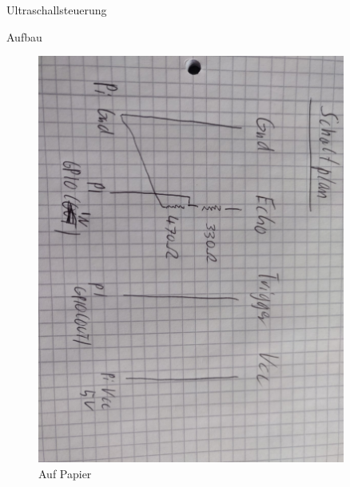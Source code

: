 \documentclass[12pt,twoside]{report}
\begin{document}
\begin{section}{Ultraschallsteuerung}
\begin{subsection}{Aufbau}
        \begin{figure}
            \centering
            \begin{minipage}{0.45\textwidth}
                \centering
                \includegraphics[width=0.9\textwidth]{lernportfolio_assets/Schaltplan_Ultraschallsensor1} %
                \caption{Auf Papier}
            \end{minipage}\hfill
            \begin{minipage}{0.45\textwidth}
                \centering

\end{minipage}
\end{figure}
\end{subsection}
\end{section}
\end{document}
